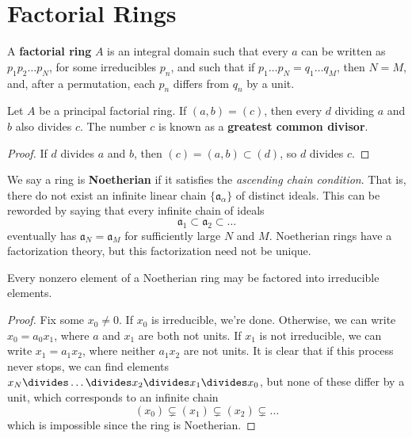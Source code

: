\section{Factorial Rings}

A {\bf factorial ring} $A$ is an integral domain such that every $a$ can be written as $p_1 p_2 \dots p_N$, for some irreducibles $p_n$, and such that if $p_1 \dots p_N = q_1 \dots q_M$, then $N = M$, and, after a permutation, each $p_n$ differs from $q_n$ by a unit.

\begin{theorem}
    Let $A$ be a principal factorial ring. If $(a,b) = (c)$, then every $d$ dividing $a$ and $b$ also divides $c$. The number $c$ is known as a {\bf greatest common divisor}.
\end{theorem}
\begin{proof}
    If $d$ divides $a$ and $b$, then $(c) = (a,b) \subset (d)$, so $d$ divides $c$.
\end{proof}

We say a ring is {\bf Noetherian} if it satisfies the {\it ascending chain condition}. That is, there do not exist an infinite linear chain $\{ \mathfrak{a}_\alpha \}$ of distinct ideals. This can be reworded by saying that every infinite chain of ideals
%
\[ \mathfrak{a}_1 \subset \mathfrak{a}_2 \subset \dots \]
%
eventually has $\mathfrak{a}_N = \mathfrak{a}_M$ for sufficiently large $N$ and $M$. Noetherian rings have a factorization theory, but this factorization need not be unique.

\begin{theorem}
    Every nonzero element of a Noetherian ring may be factored into irreducible elements.
\end{theorem}
\begin{proof}
    Fix some $x_0 \neq 0$. If $x_0$ is irreducible, we're done. Otherwise, we can write $x_0 = a_0x_1$, where $a$ and $x_1$ are both not units. If $x_1$ is not irreducible, we can write $x_1 = a_1x_2$, where neither $a_1x_2$ are not units. It is clear that if this process never stops, we can find elements $x_N \divides \dots \divides x_2 \divides x_1 \divides x_0$, but none of these differ by a unit, which corresponds to an infinite chain
    \[ (x_0) \subsetneq (x_1) \subsetneq (x_2) \subsetneq \dots \]
    which is impossible since the ring is Noetherian.
\end{proof}

